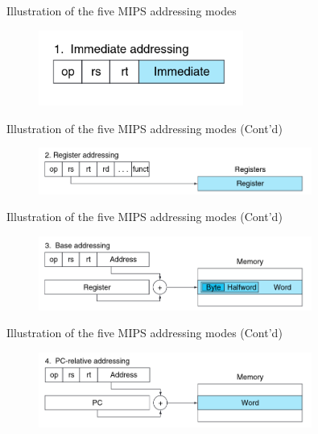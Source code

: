 \begin{frame}{Illustration of the five MIPS addressing modes}
\begin{figure}
\begin{center}
\includegraphics[width=0.6\textwidth, height=0.4\textheight]{docs/images/addr-1}
\end{center}
\end{figure}
\end{frame}

\begin{frame}{Illustration of the five MIPS addressing modes (Cont'd)}
\begin{figure}
\begin{center}
\includegraphics[width=0.8\textwidth, height=0.25\textheight]{docs/images/addr-2}
\end{center}
\end{figure}
\end{frame}
\begin{frame}{Illustration of the five MIPS addressing modes (Cont'd)}
\begin{figure}
\begin{center}
\includegraphics[width=0.8\textwidth, height=0.4\textheight]{docs/images/addr-3}
\end{center}
\end{figure}
\end{frame}
\begin{frame}{Illustration of the five MIPS addressing modes (Cont'd)}
\begin{figure}
\begin{center}
\includegraphics[width=0.8\textwidth, height=0.45\textheight]{docs/images/addr-4}
\end{center}
\end{figure}
\end{frame}
